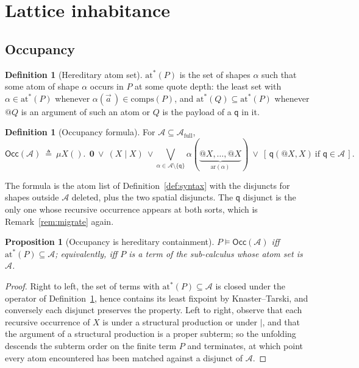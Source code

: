 \documentclass[11pt]{article}
\makeatletter
\theoremstyle{plain}
\newtheorem{proposition}[theorem]{Proposition}
\theoremstyle{definition}
\newtheorem{definition}[theorem]{Definition}
\theoremstyle{remark}
\newcommand{\quo}[1]{@#1}
\newcommand{\nil}{\mathbf{0}}
\newcommand{\qq}{\mathsf{q}}
\newcommand{\sat}{\models}
\newcommand{\Occ}{\mathsf{Occ}}
\newcommand{\Atm}{\mathcal{A}}
\newcommand{\atoms}[1]{\mathrm{at}^{*}(#1)}
\newcommand{\comps}[1]{\mathrm{comps}(#1)}
\newcommand{\fix}{\mu}
\makeatother
\begin{document}
\section{Lattice inhabitance}
\label{sec:occ}

\subsection{Occupancy}

\begin{definition}[Hereditary atom set]
$\atoms{P}$ is the set of shapes $\alpha$ such that some atom of shape $\alpha$
occurs in $P$ at some quote depth: the least set with
$\alpha \in \atoms{P}$ whenever $\alpha(\vec a\,) \in \comps{P}$, and
$\atoms{Q} \subseteq \atoms{P}$ whenever $\quo{Q}$ is an argument of such an
atom or $Q$ is the payload of a $\qq$ in it.
\end{definition}

\begin{definition}[Occupancy formula]
\label{def:occ}
For $\Atm \subseteq \Atm_{\mathrm{full}}$,
\[
  \Occ(\Atm) \ \triangleq\ \fix X().\ \ \nil \ \vee\ (X \mid X)
  \ \vee \bigvee_{\alpha \in \Atm \setminus \{\qq\}}
     \alpha(\underbrace{\quo{X},\dots,\quo{X}}_{\mathrm{ar}(\alpha)})
  \ \vee\ [\,\qq(\quo{X},X) \ \text{if } \qq \in \Atm\,].
\]
\end{definition}

The formula is the atom list of Definition~\ref{def:syntax} with the disjuncts
for shapes outside $\Atm$ deleted, plus the two spatial disjuncts. The $\qq$
disjunct is the only one whose recursive occurrence appears at both sorts,
which is Remark~\ref{rem:migrate} again.

\begin{proposition}[Occupancy is hereditary containment]
\label{prop:occ}
$P \sat \Occ(\Atm)$ iff $\atoms{P} \subseteq \Atm$; equivalently, iff $P$ is a
term of the sub-calculus whose atom set is $\Atm$.
\end{proposition}

\begin{proof}
Right to left, the set of terms with $\atoms{P} \subseteq \Atm$ is closed under
the operator of Definition~\ref{def:occ}, hence contains its least fixpoint by
Knaster--Tarski, and conversely each disjunct preserves the property. Left to
right, observe that each recursive occurrence of $X$ is under a structural
production or under $\mid$, and that the argument of a structural production is
a proper subterm; so the unfolding descends the subterm order on the finite term
$P$ and terminates, at which point every atom encountered has been matched
against a disjunct of $\Atm$.
\end{proof}
\end{document}
